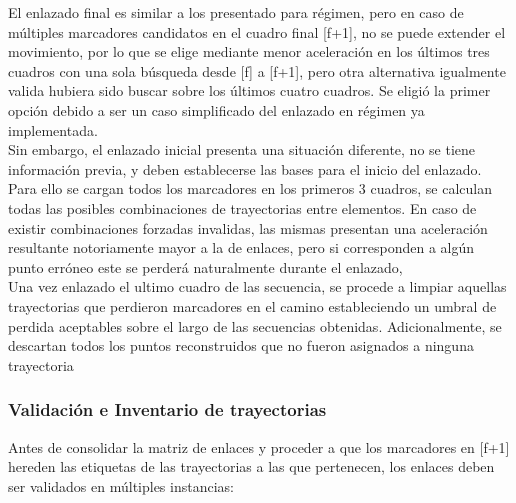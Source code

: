 El enlazado final es similar a los presentado para régimen, pero en caso de múltiples marcadores candidatos en el cuadro final [f+1], no se puede extender el movimiento, por lo que se elige mediante menor aceleración en los últimos tres cuadros con una sola búsqueda desde [f] a [f+1], pero otra alternativa igualmente valida hubiera sido buscar sobre los últimos cuatro cuadros. Se eligió la primer opción debido a  ser un caso simplificado del enlazado en régimen ya implementada. 
\\ 

Sin embargo, el enlazado inicial presenta una situación diferente, no se tiene información previa, y deben establecerse las bases para el inicio del enlazado. Para ello se cargan todos los marcadores en los primeros 3 cuadros, se calculan todas las posibles combinaciones de trayectorias entre elementos. En caso de existir combinaciones forzadas invalidas, las mismas presentan una aceleración resultante notoriamente mayor a la de enlaces, pero si corresponden a algún punto erróneo este se perderá naturalmente durante el enlazado,
\\ 

Una vez enlazado el ultimo cuadro de las secuencia, se procede a limpiar aquellas trayectorias que perdieron marcadores en el camino estableciendo un umbral de perdida aceptables sobre el largo de las secuencias obtenidas. Adicionalmente, se descartan todos los puntos reconstruidos que no fueron asignados a ninguna trayectoria 


\subsubsection{Validación e Inventario de trayectorias}

Antes de consolidar la matriz de enlaces y proceder a que los marcadores en [f+1] hereden las etiquetas de las trayectorias a las que pertenecen, los enlaces deben ser validados en múltiples instancias:

